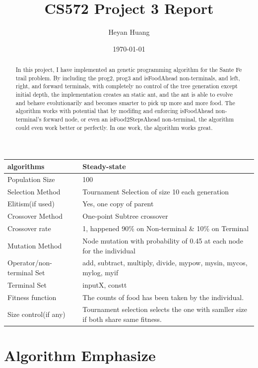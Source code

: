 \documentclass[10pt,b5paper]{article}
\author{Heyan Huang}
\date{\today}
\title{CS572 Project 3 Report}
\begin{document}
\maketitle
\tableofcontents

\begin{abstract}
In this project, I have implemented an genetic programming algorithm for the Sante Fe trail problem. By including the prog2, prog3 and isFoodAhead non-terminals, and left, right, and forward terminals, with completely no control of the tree generation except initial depth, the implementation creates an static ant, and the ant is able to evolve and behave evolutionarily and becomes smarter to pick up more and more food. The algorithm works with potential that by modifing and enforcing isFoodAhead non-terminal's forward node, or even an isFood2StepsAhead non-terminal, the algorithm could even work better or perfectly. In one work, the algorithm works great.
\end{abstract}

\begin{center}
\begin{tabular}{ll}
\hline
algorithms & Steady-state\\
\hline
Population Size & 100\\
Selection Method & Tournament Selection of size 10 each generation\\
Elitism(if used) & Yes, one copy of parent\\
Crossover Method & One-point Subtree crossover\\
Crossover rate & 1, happened 90\% on Non-terminal \& 10\% on Terminal\\
Mutation Method & Node mutation with probability of 0.45 at each node for the individual\\
Operator/non-terminal Set & add, subtract, multiply, divide, mypow, mysin, mycos, mylog, myif\\
Terminal Set & inputX, constt\\
Fitness function & The counts of food has been taken by the individual.\\
Size control(if any) & Tournament selection selects the one with samller size if both share same fitness.\\
\hline
\end{tabular}
\end{center}

\section{Algorithm Emphasize}
\label{sec-1}
\end{document}

